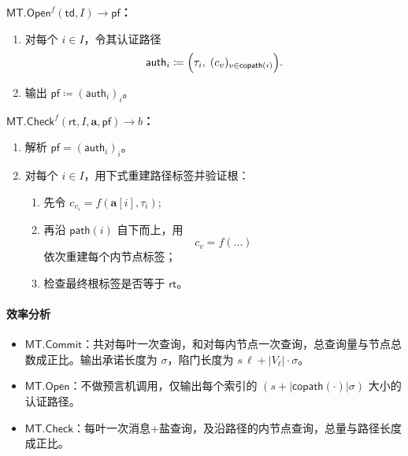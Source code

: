 \documentclass[american,singlepageview]{snargs-book-zh}
\newcommand{\DefineEqual}{\coloneqq}
\newcommand{\ProtoSalt}{\tau}
\newcommand{\ROFunction}{f}
\newcommand{\ROOutputSize}{\sigma}
\newcommand{\CMMessageLength}{\ell}
\newcommand{\MTVertexSet}{V}
\newcommand{\MTGraphVertex}{v}
\newcommand{\MTGraphLeaf}{v}
\newcommand{\MTPath}{\mathsf{path}}
\newcommand{\MTCoPath}{\mathsf{copath}}
\newcommand{\MTSymbol}{\mathsf{MT}}
\newcommand{\MTCommit}{\MTSymbol.\mathsf{Commit}}
\newcommand{\MTOpen}{\MTSymbol.\mathsf{Open}}
\newcommand{\MTCheck}{\MTSymbol.\mathsf{Check}}
\newcommand{\MTMessageLength}{\CMMessageLength}
\newcommand{\MTSaltSize}{s}
\newcommand{\MTVertexLabel}{c}
\newcommand{\MTCommitment}{\mathsf{rt}}
\newcommand{\MTTrapdoor}{\mathsf{td}}
\newcommand{\MTAuthPath}{\mathsf{auth}}
\newcommand{\MTProof}{\mathsf{pf}}
\newcommand{\MTMessageIndex}{i}
\newcommand{\MTMessageIndexSet}{I}
\newcommand{\MTMessageSubVector}{\mathbf{a}}
\newcommand{\MTSaltString}{\ProtoSalt}
\begin{document}
\medskip
\noindent\textbf{$\MTOpen^{\ROFunction}(\MTTrapdoor,\MTMessageIndexSet)\to\MTProof$：}
\begin{enumerate}[nolistsep]
  \item 对每个 $\MTMessageIndex\in\MTMessageIndexSet$，令其认证路径
  \[
  \MTAuthPath_{\MTMessageIndex}
  \DefineEqual
  \Bigl(\MTSaltString_{\MTMessageIndex},\;
    (\MTVertexLabel_{\MTGraphVertex})_{\MTGraphVertex\in\MTCoPath(\MTMessageIndex)}
  \Bigr).
  \]
  \item 输出 $\MTProof\DefineEqual(\MTAuthPath_{\MTMessageIndex})_{\MTMessageIndex}$。
\end{enumerate}

\medskip
\noindent\textbf{$\MTCheck^{\ROFunction}(\MTCommitment,\MTMessageIndexSet,\MTMessageSubVector,\MTProof)\to b$：}
\begin{enumerate}[nolistsep]
  \item 解析 $\MTProof=(\MTAuthPath_{\MTMessageIndex})_{\MTMessageIndex}$。
  \item 对每个 $\MTMessageIndex\in\MTMessageIndexSet$，用下式重建路径标签并验证根：
  \begin{enumerate}[nolistsep]
    \item 先令
    \(
      \MTVertexLabel_{\MTGraphLeaf_{\MTMessageIndex}}
      =\ROFunction(\MTMessageSubVector[\MTMessageIndex],\MTSaltString_{\MTMessageIndex});
    \)
    \item 再沿 \(\MTPath(\MTMessageIndex)\) 自下而上，用
    \[
      \MTVertexLabel_{\MTGraphVertex}
      =\ROFunction(\dots)
    \]
    依次重建每个内节点标签；
    \item 检查最终根标签是否等于 $\MTCommitment$。
  \end{enumerate}
\end{enumerate}

\paragraph{效率分析}
\begin{itemize}[nolistsep]
  \item $\MTCommit$：共对每叶一次查询，和对每内节点一次查询，总查询量与节点总数成正比。输出承诺长度为 $\ROOutputSize$，陷门长度为 $\MTSaltSize\,\MTMessageLength + |\MTVertexSet_{\MTMessageLength}|\cdot\ROOutputSize$。
  \item $\MTOpen$：不做预言机调用，仅输出每个索引的 $(\MTSaltSize+\!|\MTCoPath(\cdot)|\ROOutputSize)$ 大小的认证路径。
  \item $\MTCheck$：每叶一次消息+盐查询，及沿路径的内节点查询，总量与路径长度成正比。
\end{itemize}
\end{document}
